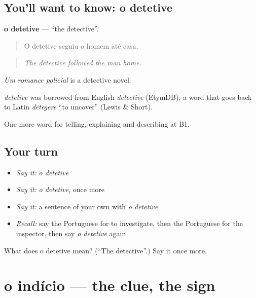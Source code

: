 \subsection*{You'll want to know: o detetive}
\textbf{o detetive} — \textquotedblleft{}the detective\textquotedblright{}.

\begin{quote}
O detetive seguiu o homem até casa.
\end{quote}

\begin{quote}
\emph{The detective followed the man home.}
\end{quote}

\emph{Um romance policial} is a detective novel.

\begin{cousinweb}
\emph{detetive} was borrowed from English \emph{detective} (EtymDB), a word that goes back to Latin \emph{dētegere} \textquotedblleft{}to uncover\textquotedblright{} (Lewis \& Short).
\end{cousinweb}

\begin{grammarlens}[title={What you've built}]
One more word for telling, explaining and describing at B1.
\end{grammarlens}

\subsection*{Your turn}
\begin{itemize}
\raggedright
  \item \emph{Say it:} \emph{o detetive}
  \item \emph{Say it:} \emph{o detetive}, once more
  \item \emph{Say it:} a sentence of your own with \emph{o detetive}
  \item \emph{Recall:} say the Portuguese for to investigate, then the Portuguese for the inspector, then say \emph{o detetive} again
\end{itemize}

\begin{tcolorbox}[breakable,colback=teal!4,colframe=teal!35!black,title={Before you move on}]
What does o detetive mean? (\textquotedblleft{}The detective\textquotedblright{}.) Say it once more.
\end{tcolorbox}
\section[o indício]{o indício — the clue, the sign}

